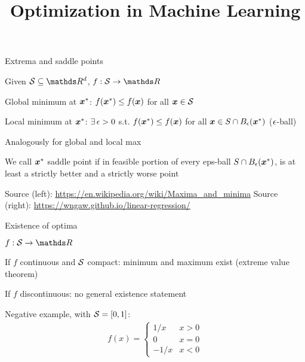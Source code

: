 \documentclass[11pt,compress,t,notes=noshow, xcolor=table]{beamer}
\title{Optimization in Machine Learning}
\begin{document}

\begin{framei}{Extrema and saddle points}
\item Given $\S \subseteq \R^d$, $f: \S \to \R$
\item Global minimum at $\xvs$: $\fxvs \le f(\xv)$ for all $\xv \in \S$
\item Local minimum at $\xvs$: $\exists\, \eps > 0$ s.t. $\fxvs \le f(\xv)$ for all $\xv \in S \cap B_\eps(\xvs)$ ($\eps$-ball)
\item Analogously for global and local max
\item We call $\xvs$ saddle point if in feasible portion of every eps-ball
$S \cap B_\eps(\xvs)$, is at least a strictly better and a strictly worse point
\vfill
{}
\begin{center}\begin{footnotesize}
Source (left): \url{https://en.wikipedia.org/wiki/Maxima_and_minima} \quad Source (right): \url{https://wngaw.github.io/linear-regression/}
\end{footnotesize}\end{center}
\end{framei}

\begin{framei}{Existence of optima}
\item $f: \S \to \R$
\item If $f$ continuous and $\S$ compact: minimum and maximum exist (extreme value theorem)
\item If $f$ discontinuous: no general existence statement
\item Negative example, with $\S = [0,1]$:
\begin{align*}
f(x) = \begin{cases}
1/x  & x > 0 \\
0    & x = 0 \\
-1/x & x < 0
\end{cases}
\end{align*}
\end{framei}
\end{document}
